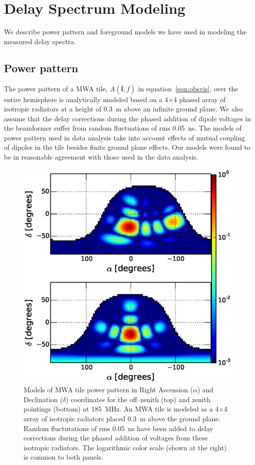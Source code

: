 \documentclass[preprint2,iop,numberedappendix]{emulateapj}
\begin{document}
\section{Delay Spectrum Modeling}\label{sec:modeling}

We describe power pattern and foreground models we have used in modeling the measured delay spectra. 

\subsection{Power pattern}\label{sec:power_pattern}

The power pattern of a MWA tile, $A(\overline{\mathbf{l}},f)$ in equation~\ref{eqn:obsvis}, over the entire hemisphere is analytically modeled based on a 4$\times$4 phased array of isotropic radiators at a height of 0.3~m above an infinite ground plane. We also assume that the delay corrections during the phased addition of dipole voltages in the beamformer suffer from random fluctuations of rms 0.05~ns. The models of power pattern used in data analysis take into account effects of mutual coupling of dipoles in the tile besides finite ground plane effects. Our models were found to be in reasonable agreement with those used in the data analysis. 

\begin{figure}[htb]
\centering
\includegraphics[width=\linewidth]{figures/v1_0/delta_array_powerpattern_0.3m_ground_custom.eps}
\caption{Models of MWA tile power pattern in Right Ascension ($\alpha$) and Declination ($\delta$) coordinates for the off--zenith (top) and zenith pointings (bottom) at 185~MHz. An MWA tile is modeled as a 4$\times$4 array of isotropic radiators placed 0.3~m above the ground plane. Random fluctutations of rms 0.05~ns have been added to delay corrections during the phased addition of voltages from these isotropic radiators. The logarithmic color scale (shown at the right) is common to both panels. \label{fig:power_pattern}}
\end{figure}
\end{document}
